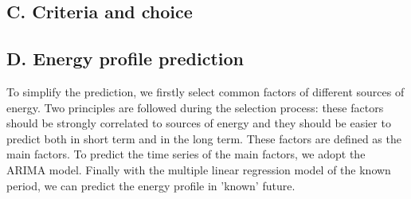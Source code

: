 \subsection{C. Criteria and choice}
\subsection{D. Energy profile prediction}
To simplify the prediction, we firstly select common factors of different sources of energy. Two principles are followed during the selection process: these factors should be strongly correlated to sources of energy and they should be easier to predict both in short term and in the long term. These factors are defined as the main factors. To predict the time series of the main factors, we adopt the ARIMA model. Finally with the multiple linear regression model of the known period, we can predict the energy profile in 'known' future.

